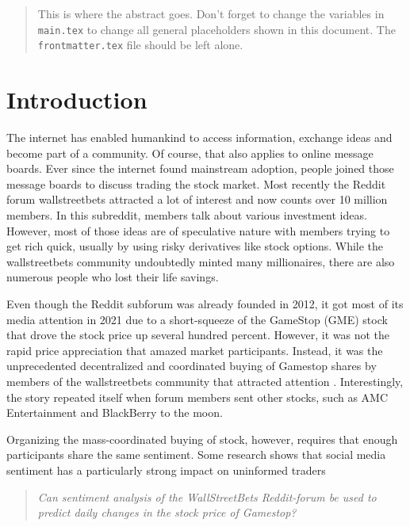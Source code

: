 \documentclass[11pt, a4paper]{article}
\begin{document}


\begin{abstract}
This is where the abstract goes. Don't forget to change the variables in \texttt{main.tex} to change all general placeholders shown in this document. The \texttt{frontmatter.tex} file should be left alone.
\end{abstract}

\section{Introduction} \label{sec:introduction}

The internet has enabled humankind to access information, exchange ideas and become part of a community. Of course, that also applies to online message boards. Ever since the internet found mainstream adoption, people joined those message boards to discuss trading the stock market. Most recently the Reddit forum wallstreetbets attracted a lot of interest and now counts over 10 million members. In this subreddit, members talk about various investment ideas. However, most of those ideas are of speculative nature with members trying to get rich quick, usually by using risky derivatives like stock options. While the wallstreetbets community undoubtedly minted many millionaires, there are also numerous people who lost their life savings.


Even though the Reddit subforum was already founded in 2012, it got most of its media attention in 2021 due to a short-squeeze of the GameStop (GME) stock that drove the stock price up several hundred percent. However, it was not the rapid price appreciation that amazed market participants. Instead, it was the unprecedented decentralized and coordinated buying of Gamestop shares by members of the wallstreetbets community that attracted attention \citep{anand2021reddit}.
Interestingly, the story repeated itself when forum members sent other stocks, such as AMC Entertainment and BlackBerry to the moon.

Organizing the mass-coordinated buying of stock, however, requires that enough participants share the same sentiment. Some research shows that social media sentiment has a particularly strong impact on uninformed traders 

\begin{quote}
\emph{Can sentiment analysis of the WallStreetBets Reddit-forum be used to predict daily changes in the stock price of Gamestop?}
\end{quote}
\end{document}

